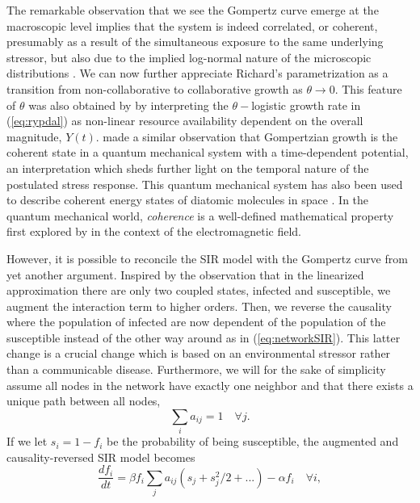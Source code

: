 \documentclass[review]{elsarticle}
\begin{document}
The remarkable observation that we see the Gompertz curve emerge at the macroscopic level implies that the system is indeed correlated, or coherent, presumably as a result of the simultaneous exposure to the same underlying stressor, but also due to the implied log-normal nature of the microscopic distributions \citep{zhang1994log}. 
We can now further appreciate Richard's parametrization as a transition from non-collaborative to collaborative growth as $\theta \rightarrow 0$. 
This feature of $\theta$ was also obtained by \citet{petroni2020logistic} by interpreting the $\theta-$logistic growth rate in (\ref{eq:rypdal}) as non-linear resource availability dependent on the overall magnitude, $Y(t)$. \citet{molski2003coherent} made a similar observation that Gompertzian growth is the coherent state in a quantum mechanical system with a time-dependent potential, an interpretation which sheds further light on the temporal nature of the postulated stress response. 
This quantum mechanical system has also been used to describe coherent energy states of diatomic molecules in space \citep{morse1929diatomic}. 
In the quantum mechanical world, \emph{coherence} is a well-defined mathematical property first explored by \citet{glauber1963coherent} in the context of the electromagnetic field.

However, it is possible to reconcile the SIR model with the Gompertz curve from yet another argument. 
Inspired by the observation that in the linearized approximation there are only two coupled states, infected and susceptible, we augment the interaction term to higher orders. 
Then, we reverse the causality where the population of infected are now dependent of the population of the susceptible instead of the other way around as in (\ref{eq:networkSIR}). 
This latter change is a crucial change which is based on an environmental stressor rather than a communicable disease.
Furthermore, we will for the sake of simplicity assume all nodes in the network have exactly one neighbor and that there exists a unique path between all nodes,
\begin{equation}
\sum_i a_{ij} = 1 \quad \forall j.
\end{equation} 
If we let $s_i = 1 - f_i$ be the probability of being susceptible, the augmented and causality-reversed SIR model becomes 
\begin{equation}
\frac{d f_i}{dt} = \beta f_i\sum_j{a_{ij}}(s_{j} + s^2_j/2 + ...) - \alpha f_i\quad \forall i,
\end{equation}
\end{document}

